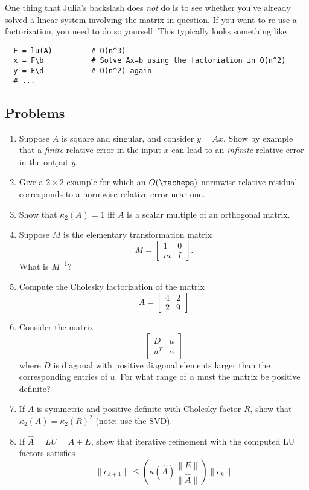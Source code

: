 \documentclass[12pt, leqno]{article}
\begin{document}
One thing that Julia's backslash does {\em not} do is to see whether
you've already solved a linear system involving the matrix in
question.  If you want to re-use a factorization, you need to do so
yourself.  This typically looks something like
\begin{lstlisting}
  F = lu(A)         # O(n^3)
  x = F\b           # Solve Ax=b using the factoriation in O(n^2)
  y = F\d           # O(n^2) again
  # ...
\end{lstlisting}

\subsection{Problems}

\begin{enumerate}
\item
  Suppose $A$ is square and singular, and consider $y = Ax$.
  Show by example that a {\em finite} relative error in the input
  $x$ can lead to an {\em infinite} relative error in the output $y$.
\item
  Give a $2 \times 2$ example for which an $O(\macheps)$ normwise
  relative residual corresponds to a normwise relative error near one.
\item
  Show that $\kappa_2(A) = 1$ iff $A$ is a scalar multiple of an
  orthogonal matrix.
\item
  Suppose $M$ is the elementary transformation matrix
  \[
    M = \begin{bmatrix} 1 & 0 \\ m & I \end{bmatrix}.
  \]
  What is $M^{-1}$?
\item
  Compute the Cholesky factorization of the matrix
  \[
  A = \begin{bmatrix}
         4 & 2 \\
         2 & 9
      \end{bmatrix}
  \]
\item
  Consider the matrix
  \[
  \begin{bmatrix}
    D & u \\
    u^T & \alpha
  \end{bmatrix}
  \]
  where $D$ is diagonal with positive diagonal elements larger than the
  corresponding entries of $u$.  For what range of $\alpha$ must
  the matrix be positive definite?
\item
  If $A$ is symmetric and positive definite with Cholesky factor $R$,
  show that $\kappa_2(A) = \kappa_2(R)^2$ (note: use the SVD).
\item
  If $\hat{A} = LU = A+E$, show that iterative refinement with
  the computed LU factors satisfies
  \[
    \|e_{k+1}\| \leq
    \left( \kappa(\hat{A}) \frac{\|E\|}{\|\hat{A}\|} \right) \|e_k\|
  \]
\end{enumerate}
\end{document}

